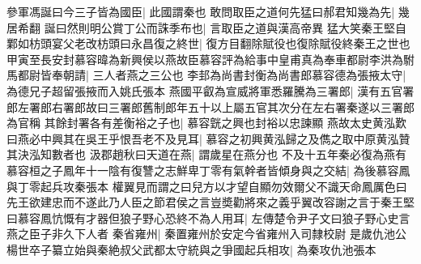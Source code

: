 參軍馮誕曰今三子皆為國臣|{
	此國謂秦也}
敢問取臣之道何先猛曰郝君知幾為先|{
	幾居希翻}
誕曰然則明公賞丁公而誅季布也|{
	言取臣之道與漢高帝異}
猛大笑秦王堅自鄴如枋頭宴父老改枋頭曰永昌復之終世|{
	復方目翻除賦役也復除賦役終秦王之世也}
甲寅至長安封慕容暐為新興侯以燕故臣慕容評為給事中皇甫真為奉車都尉李洪為駙馬都尉皆奉朝請|{
	三人者燕之三公也}
李邽為尚書封衡為尚書郎慕容德為張掖太守|{
	為德兄子超留張掖而入姚氏張本}
燕國平叡為宣威將軍悉羅騰為三署郎|{
	漢有五官署郎左署郎右署郎故曰三署郎舊制郎年五十以上屬五官其次分在左右署秦遂以三署郎為官稱}
其餘封署各有差衡裕之子也|{
	慕容皝之興也封裕以忠諫顯}
燕故太史黄泓歎曰燕必中興其在吳王乎恨吾老不及見耳|{
	慕容之初興黄泓歸之及儁之取中原黄泓贊其決泓知數者也}
汲郡趙秋曰天道在燕|{
	謂歲星在燕分也}
不及十五年秦必復為燕有慕容桓之子鳳年十一陰有復讐之志鮮卑丁零有氣幹者皆傾身與之交結|{
	為後慕容鳳與丁零起兵攻秦張本}
權翼見而謂之曰兒方以才望自顯勿效爾父不識天命鳳厲色曰先王欲建忠而不遂此乃人臣之節君侯之言豈奬勸將來之義乎翼改容謝之言于秦王堅曰慕容鳳忼慨有才器但狼子野心恐終不為人用耳|{
	左傳楚令尹子文曰狼子野心史言燕之臣子非久下人者}
秦省雍州|{
	秦置雍州於安定今省雍州入司隸校尉}
是歲仇池公楊世卒子纂立始與秦絶叔父武都太守統與之爭國起兵相攻|{
	為秦攻仇池張本}


